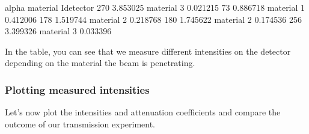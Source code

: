 \documentclass[letterpaper,10pt,english]{sphinxmanual}
\begin{document}
\begin{sphinxVerbatim}[commandchars=\\\{\}]
        alpha    material  I\PYGZus{}detector
270  3.853025  material 3    0.021215
73   0.886718  material 1    0.412006
178  1.519744  material 2    0.218768
180  1.745622  material 2    0.174536
256  3.399326  material 3    0.033396
\end{sphinxVerbatim}

\sphinxAtStartPar
In the table, you can see that we measure different intensities on the detector depending on the material the beam is penetrating.


\subsubsection{Plotting measured intensities}
\label{\detokenize{04-BasicSegmentation:plotting-measured-intensities}}
\sphinxAtStartPar
Let’s now plot the intensities and attenuation coefficients and compare the outcome of our transmission experiment.
\end{document}
